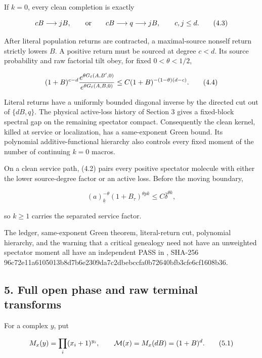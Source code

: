 If \(k=0\), every clean completion is exactly

\[
                 cB\longrightarrow jB,
 \qquad\hbox{or}\qquad
                 cB\longrightarrow q\longrightarrow jB,
 \qquad c,j\le d.                                          \tag{4.3}
\]

After literal population returns are contracted, a maximal-source
nonself return strictly lowers \(B\). A positive return must be sourced
at degree \(c<d\). Its source probability and raw factorial tilt obey,
for fixed \(0<\theta<1/2\),

\[
 (1+B)^{c-d}
 {e^{\theta G_\ell(A,B',0)}
       \over e^{\theta G_\ell(A,B,0)}}
 \le C(1+B)^{-(1-\theta)(d-c)}.                            \tag{4.4}
\]

Literal returns have a uniformly bounded diagonal inverse by the
directed cut out of \(\{dB,q\}\). The physical active-loss history of
Section 3 gives a fixed-block spectral gap on the remaining spectator
compact. Consequently the clean kernel, killed at service or
localization, has a same-exponent Green bound. Its polynomial
additive-functional hierarchy also controls every fixed moment of the
number of continuing \(k=0\) macros.

On a clean service path, (4.2) pairs every positive spectator molecule
with either the lower source-degree factor or an active loss. Before the
moving boundary,

\[
 (a)_{\underline k}^{-\theta}(1+B_\tau)^{\theta pk}
                       \le C\bar\delta^{\theta k},          \tag{4.5}
\]

so \(k\ge1\) carries the separated service factor.

The ledger, same-exponent Green theorem, literal-return cut, polynomial
hierarchy, and the warning that a critical genealogy need not have an
unweighted spectator moment all have an independent PASS in
\texttt{}, SHA-256
96c72e11a6105013b8d7b6e2309da7c2dbebccfa0b72640bfb3cfe6cf1608b36.

\subsection{5. Full open phase and raw terminal
transforms}

For a complex \(y\), put

\[
 M_x(y)=\prod_i(x_i+1)^{y_i},\qquad
 {\cal M}(x)=M_x(dB)=(1+B)^d.                              \tag{5.1}
\]

